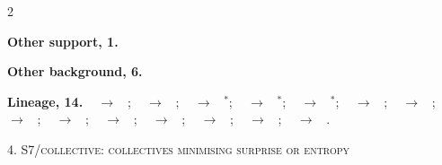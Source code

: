 \documentclass[10pt]{article}
\newcommand{\memb}[1]{\par\smallskip\textbf{#1}\quad}
\begin{document}
\begin{multicols}{2}
\memb{Other support, 1.} \citetext{\citealp{Huang-large06}}

\memb{Other background, 6.} {\footnotesize \citetext{\citealp{Feleqi-derivation13}\dag; \citealp{Nourian-epsilon13}; \citealp{Lacker-mean19}; \citealp{Carmona-kuramoto25}; \citealp{Leonte-convergence25}; \citealp{Zeng-learning25}}}

\end{multicols}
\memb{Lineage, 14.} {\footnotesize \citeauthor{Huang-large06}~\citeyear{Huang-large06} $\to$ \citeauthor{Huang-large07}~\citeyear{Huang-large07}; \citeauthor{Huang-large07}~\citeyear{Huang-large07} $\to$ \citeauthor{Huang-large10}~\citeyear{Huang-large10}; \citeauthor{Huang-large10}~\citeyear{Huang-large10} $\to$ \citeauthor{Nourian-epsilon13}~\citeyear{Nourian-epsilon13}$^\ast$; \citeauthor{Nourian-epsilon13}~\citeyear{Nourian-epsilon13} $\to$ \citeauthor{Carmona-probabilistic16}~\citeyear{Carmona-probabilistic16}$^\ast$; \citeauthor{Carmona-probabilistic16}~\citeyear{Carmona-probabilistic16} $\to$ \citeauthor{Carmona-alternative17}~\citeyear{Carmona-alternative17}$^\ast$; \citeauthor{Caines-graphon20}~\citeyear{Caines-graphon20} $\to$ \citeauthor{Hu-graphon22}~\citeyear{Hu-graphon22}; \citeauthor{Caines-graphon20}~\citeyear{Caines-graphon20} $\to$ \citeauthor{Guo-mesob23}~\citeyear{Guo-mesob23}; \citeauthor{Caines-graphon20}~\citeyear{Caines-graphon20} $\to$ \citeauthor{Leonte-convergence25}~\citeyear{Leonte-convergence25}; \citeauthor{Caines-graphon20}~\citeyear{Caines-graphon20} $\to$ \citeauthor{Braun-mean26}~\citeyear{Braun-mean26}; \citeauthor{Cui-learning21}~\citeyear{Cui-learning21} $\to$ \citeauthor{Hu-graphon22}~\citeyear{Hu-graphon22}; \citeauthor{Cui-learning21}~\citeyear{Cui-learning21} $\to$ \citeauthor{Guo-mesob23}~\citeyear{Guo-mesob23}; \citeauthor{Cui-learning21}~\citeyear{Cui-learning21} $\to$ \citeauthor{Leonte-convergence25}~\citeyear{Leonte-convergence25}; \citeauthor{Cui-learning21}~\citeyear{Cui-learning21} $\to$ \citeauthor{Braun-mean26}~\citeyear{Braun-mean26}; \citeauthor{Zeng-learning24}~\citeyear{Zeng-learning24} $\to$ \citeauthor{Zeng-learning25}~\citeyear{Zeng-learning25}.}

\medskip\textsc{4. S7/collective: collectives minimising surprise or entropy}
\end{document}
